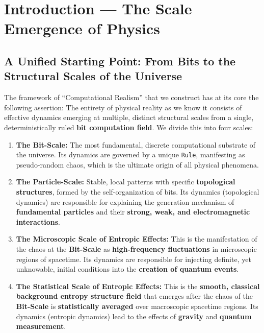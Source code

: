 \documentclass[11pt]{article}
\begin{document}
\section{Introduction — The Scale Emergence of Physics}

\subsection{A Unified Starting Point: From Bits to the Structural Scales of the Universe}

The framework of ``Computational Realism'' that we construct has at its core the following assertion: The entirety of physical reality as we know it consists of effective dynamics emerging at multiple, distinct structural scales from a single, deterministically ruled \textbf{bit computation field}. We divide this into four scales:

\begin{enumerate}
    \item   \textbf{The Bit-Scale:} The most fundamental, discrete computational substrate of the universe. Its dynamics are governed by a unique \texttt{Rule}, manifesting as pseudo-random chaos, which is the ultimate origin of all physical phenomena.
    
    \item   \textbf{The Particle-Scale:} Stable, local patterns with specific \textbf{topological structures}, formed by the self-organization of bits. Its dynamics (topological dynamics) are responsible for explaining the generation mechanism of \textbf{fundamental particles} and their \textbf{strong, weak, and electromagnetic interactions}.
    
    \item   \textbf{The Microscopic Scale of Entropic Effects:} This is the manifestation of the chaos at the \textbf{Bit-Scale} as \textbf{high-frequency fluctuations} in microscopic regions of spacetime. Its dynamics are responsible for injecting definite, yet unknowable, initial conditions into the \textbf{creation of quantum events}.
    
    \item   \textbf{The Statistical Scale of Entropic Effects:} This is the \textbf{smooth, classical background entropy structure field} that emerges after the chaos of the \textbf{Bit-Scale} is \textbf{statistically averaged} over macroscopic spacetime regions. Its dynamics (entropic dynamics) lead to the effects of \textbf{gravity} and \textbf{quantum measurement}.
\end{enumerate}
\end{document}
